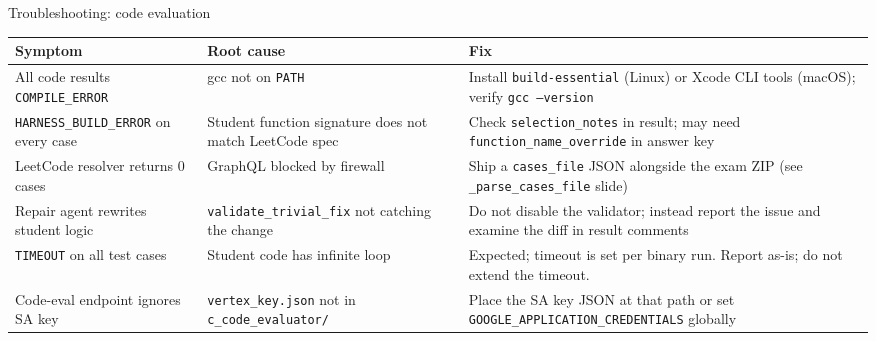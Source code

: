 \documentclass[aspectratio=169]{beamer}
\begin{document}
\begin{frame}{Troubleshooting: code evaluation}
  \tiny
  \begin{tabular}{@{}p{4.2cm}p{4.4cm}p{5.1cm}@{}}
    \toprule
    Symptom & Root cause & Fix \\
    \midrule
    All code results \texttt{COMPILE\_ERROR} & gcc not on \texttt{PATH} & Install \texttt{build-essential} (Linux) or Xcode CLI tools (macOS); verify \texttt{gcc --version} \\
    \texttt{HARNESS\_BUILD\_ERROR} on every case & Student function signature does not match LeetCode spec & Check \texttt{selection\_notes} in result; may need \texttt{function\_name\_override} in answer key \\
    LeetCode resolver returns 0 cases & GraphQL blocked by firewall & Ship a \texttt{cases\_file} JSON alongside the exam ZIP (see \texttt{\_parse\_cases\_file} slide) \\
    Repair agent rewrites student logic & \texttt{validate\_trivial\_fix} not catching the change & Do not disable the validator; instead report the issue and examine the diff in result comments \\
    \texttt{TIMEOUT} on all test cases & Student code has infinite loop & Expected; timeout is set per binary run. Report as-is; do not extend the timeout. \\
    Code-eval endpoint ignores SA key & \texttt{vertex\_key.json} not in \texttt{c\_code\_evaluator/} & Place the SA key JSON at that path or set \texttt{GOOGLE\_APPLICATION\_CREDENTIALS} globally \\
    \bottomrule
  \end{tabular}
\end{frame}
\end{document}
